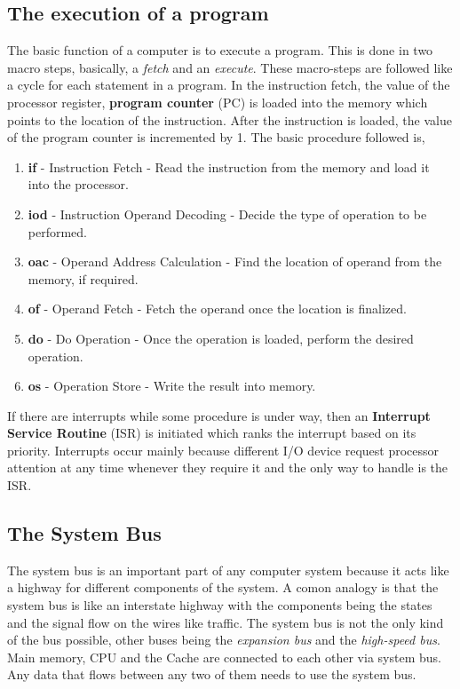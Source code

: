 \documentclass{article}
\begin{document}
\subsection{The execution of a program}
The basic function of a computer is to execute a program. This is done in two macro steps, basically, a \textit{fetch} and an \textit{execute}. These macro-steps are followed like a cycle for each statement in a program. In the instruction fetch, the value of the processor register, \textbf{program counter} (PC) is loaded into the memory which points to the location of the instruction. After the instruction is loaded, the value of the program counter is incremented by 1. The basic procedure followed is,
\begin{enumerate}
\item \textbf{if} - Instruction Fetch - Read the instruction from the memory and load it into the processor.
\item \textbf{iod} - Instruction Operand Decoding - Decide the type of operation to be performed.
\item \textbf{oac} - Operand Address Calculation - Find the location of operand from the memory, if required.
\item \textbf{of} - Operand Fetch - Fetch the operand once the location is finalized.
\item \textbf{do} - Do Operation - Once the operation is loaded, perform the desired operation.
\item \textbf{os} - Operation Store - Write the result into memory.
\end{enumerate}
If there are interrupts while some procedure is under way, then an \textbf{Interrupt Service Routine} (ISR) is initiated which ranks the interrupt based on its priority. Interrupts occur mainly because different I/O device request processor attention at any time whenever they require it and the only way to handle is the ISR.
\newpage

\subsection{The System Bus}
The system bus is an important part of any computer system because it acts like a highway for different components of the system. A comon analogy is that the system bus is like an interstate highway with the components being the states and the signal flow on the wires like traffic. The system bus is not the only kind of the bus possible, other buses being the \textit{expansion bus} and the \textit{high-speed bus}. Main memory, CPU and the Cache are connected to each other via system bus. Any data that flows between any two of them needs to use the system bus.
\end{document}
